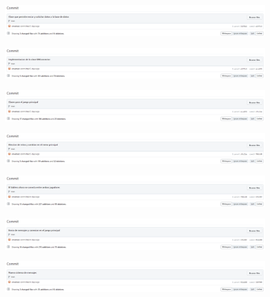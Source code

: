 \documentclass{article}
\begin{document}
\begin{figure}[H]
	\centering
	\includegraphics[width=1\textwidth,keepaspectratio]{img/commit_14.png}
\end{figure}
\begin{figure}[H]
	\centering
	\includegraphics[width=1\textwidth,keepaspectratio]{img/commit_15.png}
\end{figure}
\begin{figure}[H]
	\centering
	\includegraphics[width=1\textwidth,keepaspectratio]{img/commit_16.png}
\end{figure}
\begin{figure}[H]
	\centering
	\includegraphics[width=1\textwidth,keepaspectratio]{img/commit_17.png}
\end{figure}
\begin{figure}[H]
	\centering
	\includegraphics[width=1\textwidth,keepaspectratio]{img/commit_18.png}
\end{figure}
\begin{figure}[H]
	\centering
	\includegraphics[width=1\textwidth,keepaspectratio]{img/commit_19.png}
\end{figure}
\begin{figure}[H]
	\centering
	\includegraphics[width=1\textwidth,keepaspectratio]{img/commit_20.png}
\end{figure}
\end{document}
